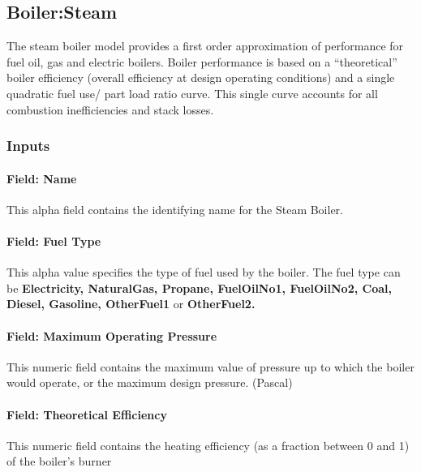 \subsection{Boiler:Steam}\label{boilersteam}

The steam boiler model provides a first order approximation of performance for fuel oil, gas and electric boilers. Boiler performance is based on a ``theoretical'' boiler efficiency (overall efficiency at design operating conditions) and a single quadratic fuel use/ part load ratio curve. This single curve accounts for all combustion inefficiencies and stack losses.

\subsubsection{Inputs}\label{inputs-11-012}

\paragraph{Field: Name}\label{field-name-10-011}

This alpha field contains the identifying name for the Steam Boiler.

\paragraph{Field: Fuel Type}\label{field-fuel-type-4}

This alpha value specifies the type of fuel used by the boiler. The fuel type can be \textbf{Electricity, NaturalGas, Propane, FuelOilNo1, FuelOilNo2, Coal, Diesel, Gasoline, OtherFuel1} or \textbf{OtherFuel2.}

\paragraph{Field: Maximum Operating Pressure}\label{field-maximum-operating-pressure}

This numeric field contains the maximum value of pressure up to which the boiler would operate, or the maximum design pressure. (Pascal)

\paragraph{Field: Theoretical Efficiency}\label{field-theoretical-efficiency}

This numeric field contains the heating efficiency (as a fraction between 0 and 1) of the boiler's burner

